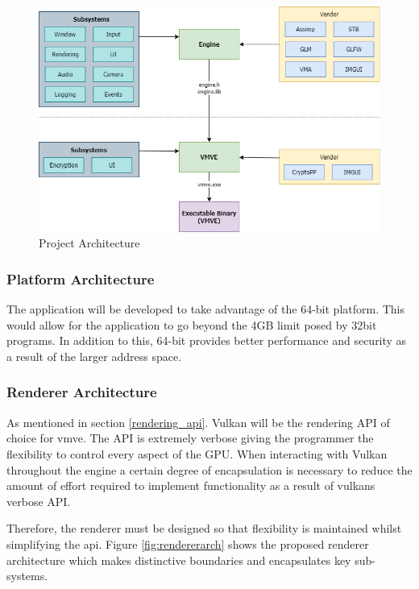 \documentclass[11pt]{article}
\begin{document}
\begin{figure}[H]
  \centering
  \includegraphics[width=\textwidth]{images/project_architecture.png}
  \caption{Project Architecture}
  \label{fig:projarch}
\end{figure}

\subsubsection{Platform Architecture}
The application will be developed to take advantage of the 64-bit platform. This
would allow for the application to go beyond the 4GB limit posed by 32bit
programs. In addition to this, 64-bit provides better performance and security
as a result of the larger address space.

\subsubsection{Renderer Architecture}
As mentioned in section \ref{rendering_api}. Vulkan will be the rendering API of
choice for \gls*{vmve}. The API is extremely verbose giving the programmer the
flexibility to control every aspect of the GPU. When interacting with Vulkan
throughout the engine a certain degree of encapsulation is necessary to reduce
the amount of effort required to implement functionality as a result of
\glspl*{vulkan} verbose API.

Therefore, the renderer must be designed so that flexibility is maintained
whilst simplifying the \gls{api}. Figure \ref{fig:rendererarch} shows the
proposed renderer architecture which makes distinctive boundaries and
encapsulates key sub-systems.
\end{document}
